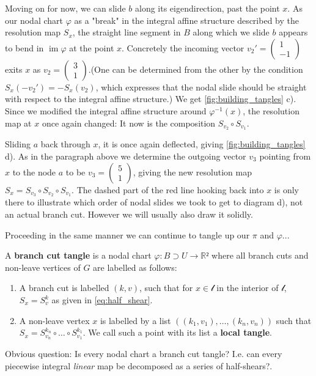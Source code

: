 \documentclass[12pt,a4paper,abstract=true,draft]{scrartcl}
\DeclareMathOperator{\im}{im}
\newcommand\mqty[1]{\begin{pmatrix}#1\end{pmatrix}}
\begin{document}
\begin{example}
  Moving on for now, we can slide $b$ along its eigendirection, past the point $x$.
  As our nodal chart $φ$ as a "break" in the integral affine structure described by the resolution map $S_x$, the straight line segment in $B$ along which we slide $b$ appears to bend in $\im φ$ at the point $x$.
  Concretely the incoming vector $v_2' = \mqty{1\\-1}$ exits $x$ as $v_2 = \mqty{3\\1}$.(One can be determined from the other by the condition $S_x(-v_2') = -S_x(v_2)$, which expresses that the nodal slide should be straight with respect to the integral affine structure.)
  We get \cref{fig:building_tangles} c).
  Since we modified the integral affine structure around $φ^{-1}(x)$, the resolution map at $x$ once again changed: It now is the composition $S_{v_2} ∘ S_{v_1}$.

  Sliding $a$ back through $x$, it is once again deflected, giving \cref{fig:building_tangles} d).
As in the paragraph above we determine the outgoing vector $v_3$ pointing from $x$ to the node $a$ to be $v_3 = \mqty{5\\1}$, giving the new resolution map $S_x = S_{v_3} ∘ S_{v_2} ∘ S_{v_1}$.
  The dashed part of the red line hooking back into $x$ is only there to illustrate which order of nodal slides we took to get to diagram d), not an actual branch cut.
  However we will usually also draw it solidly.
  
  Proceeding in the same manner we can continue to tangle up our $π$ and $φ$...
\end{example}



\begin{definition}
  A \textbf{branch cut tangle} is a nodal chart $φ \colon B ⊃ U → ℝ²$ where all branch cuts and non-leave vertices of $G$ are labelled as follows:
  \begin{enumerate}
    \item A branch cut is labelled $(k,v)$, such that for $x ∈ 𝓁$ in the interior of $𝓁$, $S_x = S^k_v$ as given in \eqref{eq:half_shear}.
    \item A non-leave vertex $x$ is labelled by a list $((k_1,v_1), …, (k_n,v_n))$ such that $S_x = S^{k_n}_{v_n} ∘ … ∘ S^{k_1}_{v_1}$.
      We call such a point with its list a \textbf{local tangle}.
  \end{enumerate}
\end{definition}

\begin{remark}
  Obvious question: Is every nodal chart a branch cut tangle? I.e. can every piecewise integral \emph{linear} map be decomposed as a series of half-shears?.
\end{remark}
\end{document}
